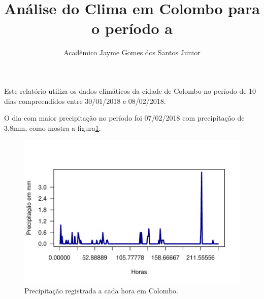 \documentclass[a4paper]{article}
\title{Análise do Clima em Colombo para o período \tc{30/01/2018} a \tc{08/02/2018}}
\author{Acadêmico Jayme Gomes dos Santos Junior}
\date{}
\newcommand{\tc}[1]{\textcolor{ballblue}{#1}}
\begin{document}


%
%
\maketitle

Este relatório utiliza os dados climáticos da cidade de Colombo no período de \tc{10} dias compreendidos entre \tc{30/01/2018} e \tc{08/02/2018}.

 \tc{O dia com maior precipitação no período foi 07/02/2018 com precipitação de 3.8mm}, como mostra a figura\ref{plot}.

\begin{figure}[h]
\includegraphics{Sabatina_clima-002}
\caption{Precipitação registrada a cada hora em Colombo.}\label{plot}
\end{figure}
\end{document}
